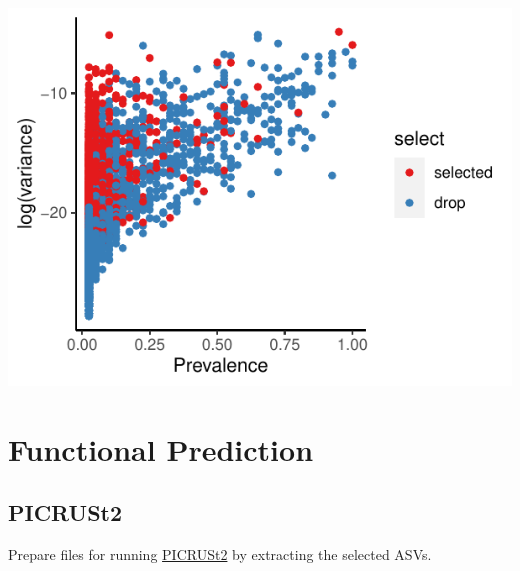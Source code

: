 \documentclass[
]{article}
\begin{document}
\includegraphics{workshop_files/figure-latex/unnamed-chunk-52-6.pdf}

\hypertarget{functional-prediction}{%
\section{Functional Prediction}\label{functional-prediction}}

\hypertarget{picrust2}{%
\subsection{PICRUSt2}\label{picrust2}}

Prepare files for running
\href{https://huttenhower.sph.harvard.edu/picrust/}{PICRUSt2} by
extracting the selected ASVs.
\end{document}
